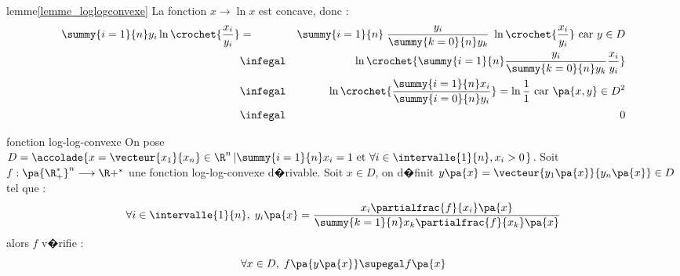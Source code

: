 \begin{xdemo}{lemme}{\ref{lemme_loglogconvexe}}
La fonction $x \longrightarrow \ln x$ est concave, donc :
        \begin{eqnarray*}
        \summy{i=1}{n} y_i \ln \crochet{\dfrac{x_i}{y_i}} &=&  \summy{i=1}{n} \;  \dfrac{y_i}{\summy{k=0}{n}y_k} \; 
                    \ln \crochet{\dfrac{x_i}{y_i}} \text{ car } y \in D\\
        &\infegal&  \ln \crochet { \summy{i=1}{n} \dfrac{y_i}{\summy{k=0}{n}y_k}  \dfrac{x_i}{y_i} } \\
        &\infegal&  \ln \crochet {  \dfrac{\summy{i=1}{n}x_i}{\summy{i=0}{n}y_i}  }  = 
        \ln \dfrac{1}{1} \text{ car } \pa{x,y} \in D^2 \\
        &\infegal& 0
        \end{eqnarray*}
\end{xdemo}











            \begin{xtheorem}{fonction log-log-convexe}
            \label{theorem_loglogconvexe}%
            On pose $D = \accolade{x=\vecteur{x_1}{x_n} \in \R^n \left| \summy{i=1}{n} x_i = 1 \text{ et } \forall i 
            \in \intervalle{1}{n}, x_i > 0 \right.} $.\newline%
            Soit $f : \pa{\R^*_+}^n \longrightarrow \R+^*$ une fonction log-log-convexe d�rivable.\newline%
            Soit $x \in D$, on d�finit $y \pa{x} = \vecteur{y_1\pa{x}}{y_n\pa{x}} \in D$ tel que :
                    $$
                    \forall i \in \intervalle{1}{n}, \; y_i \pa{x} = \frac{x_i \partialfrac{f}{x_i}\pa{x}}
                                {\summy{k=1}{n}x_k \partialfrac{f}{x_k}\pa{x}}
                    $$
            alors $f$ v�rifie :
                    $$
                    \forall x \in D, \; f\pa{ y \pa{x}} \supegal f\pa{x}
                    $$
            \end{xtheorem}
            
            
            
